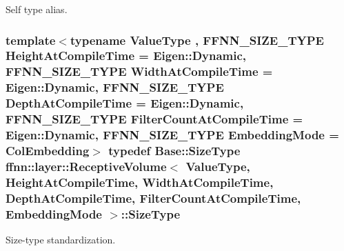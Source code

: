 Self type alias. 

\hypertarget{classffnn_1_1layer_1_1_receptive_volume_a3e9853931ec53fae609bb3fef11fa325}{
\subsubsection[{Size\-Type}]{\setlength{\rightskip}{0pt plus 5cm}template$<$typename Value\-Type , F\-F\-N\-N\-\_\-\-S\-I\-Z\-E\-\_\-\-T\-Y\-P\-E Height\-At\-Compile\-Time = Eigen\-::\-Dynamic, F\-F\-N\-N\-\_\-\-S\-I\-Z\-E\-\_\-\-T\-Y\-P\-E Width\-At\-Compile\-Time = Eigen\-::\-Dynamic, F\-F\-N\-N\-\_\-\-S\-I\-Z\-E\-\_\-\-T\-Y\-P\-E Depth\-At\-Compile\-Time = Eigen\-::\-Dynamic, F\-F\-N\-N\-\_\-\-S\-I\-Z\-E\-\_\-\-T\-Y\-P\-E Filter\-Count\-At\-Compile\-Time = Eigen\-::\-Dynamic, F\-F\-N\-N\-\_\-\-S\-I\-Z\-E\-\_\-\-T\-Y\-P\-E Embedding\-Mode = Col\-Embedding$>$ typedef {\bf Base\-::\-Size\-Type} {\bf ffnn\-::layer\-::\-Receptive\-Volume}$<$ Value\-Type, Height\-At\-Compile\-Time, Width\-At\-Compile\-Time, Depth\-At\-Compile\-Time, Filter\-Count\-At\-Compile\-Time, {\bf Embedding\-Mode} $>$\-::{\bf Size\-Type}}}\label{classffnn_1_1layer_1_1_receptive_volume_a3e9853931ec53fae609bb3fef11fa325}


Size-\/type standardization. 



